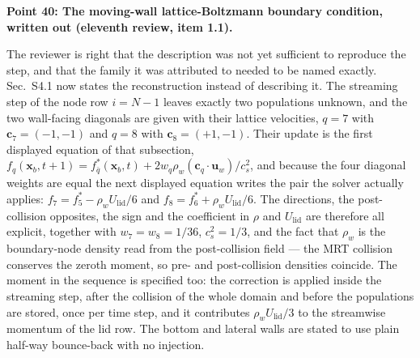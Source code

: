 \documentclass[11pt,a4paper]{article}
\begin{document}
\vspace{1em}

\noindent\textbf{Point 40: The moving-wall lattice-Boltzmann boundary condition, written
out (eleventh review, item 1.1).}

The reviewer is right that the description was not yet sufficient to reproduce the step,
and that the family it was attributed to needed to be named exactly. Sec.~S4.1 now
states the reconstruction instead of describing it. The streaming step of the node row
\(i=N-1\) leaves exactly two populations unknown, and the two wall-facing diagonals are
given with their lattice velocities, \(q=7\) with \(\mathbf{c}_7=(-1,-1)\) and \(q=8\)
with \(\mathbf{c}_8=(+1,-1)\). Their update is the first displayed equation of that
subsection,
\(f_q(\mathbf{x}_b,t+1)=f_{\bar q}^{*}(\mathbf{x}_b,t)+2w_q\rho_w(\mathbf{c}_q\!\cdot\!
\mathbf{u}_w)/c_s^{2}\), and because the four diagonal weights are equal the next
displayed equation writes the pair the solver actually applies:
\(f_7=f_5^{*}-\rho_wU_{\mathrm{lid}}/6\) and \(f_8=f_6^{*}+\rho_wU_{\mathrm{lid}}/6\). The
directions, the post-collision opposites, the sign and the coefficient in \(\rho\) and
\(U_{\mathrm{lid}}\) are therefore all explicit, together with \(w_7=w_8=1/36\),
\(c_s^{2}=1/3\), and the fact that \(\rho_w\) is the boundary-node density read from the
post-collision field --- the MRT collision conserves the zeroth moment, so pre- and
post-collision densities coincide. The moment in the sequence is specified too: the
correction is applied inside the streaming step, after the collision of the whole domain
and before the populations are stored, once per time step, and it contributes
\(\rho_wU_{\mathrm{lid}}/3\) to the streamwise momentum of the lid row. The bottom and
lateral walls are stated to use plain half-way bounce-back with no injection.
\end{document}

